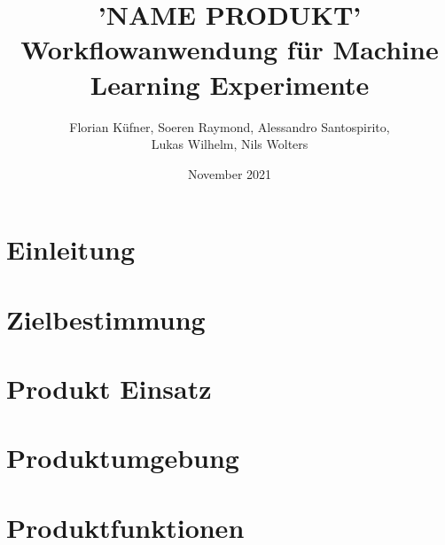 \documentclass{scrartcl}
\title{'NAME PRODUKT'
        Workflowanwendung für Machine Learning Experimente}
\author{Florian Küfner, Soeren Raymond, Alessandro Santospirito, \\ 
        Lukas Wilhelm, Nils Wolters}
\date{November 2021}
\begin{document}
\maketitle
\newpage
\tableofcontents
\section{Einleitung}
\section{Zielbestimmung}
\section{Produkt Einsatz}
\section{Produktumgebung}
\section{Produktfunktionen}
\end{document}
